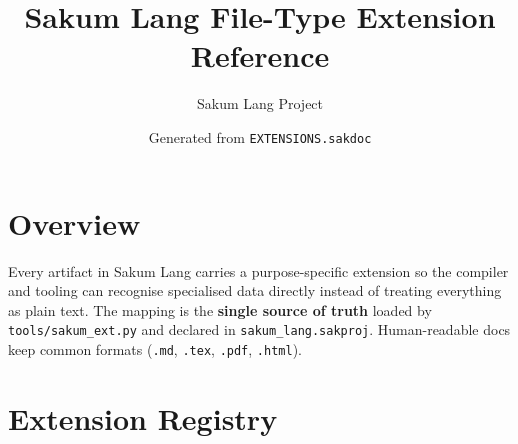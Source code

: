 \documentclass[11pt,a4paper]{article}
\title{Sakum Lang \textemdash{} File-Type Extension Reference}
\author{Sakum Lang Project}
\date{Generated from \texttt{EXTENSIONS.sakdoc}}
\begin{document}
\maketitle

\section{Overview}
Every artifact in Sakum Lang carries a purpose-specific extension so the
compiler and tooling can recognise specialised data directly instead of
treating everything as plain text. The mapping is the \textbf{single source
of truth} loaded by \texttt{tools/sakum\_ext.py} and declared in
\texttt{sakum\_lang.sakproj}. Human-readable docs keep common formats
(\texttt{.md}, \texttt{.tex}, \texttt{.pdf}, \texttt{.html}).

\section{Extension Registry}
\end{document}
